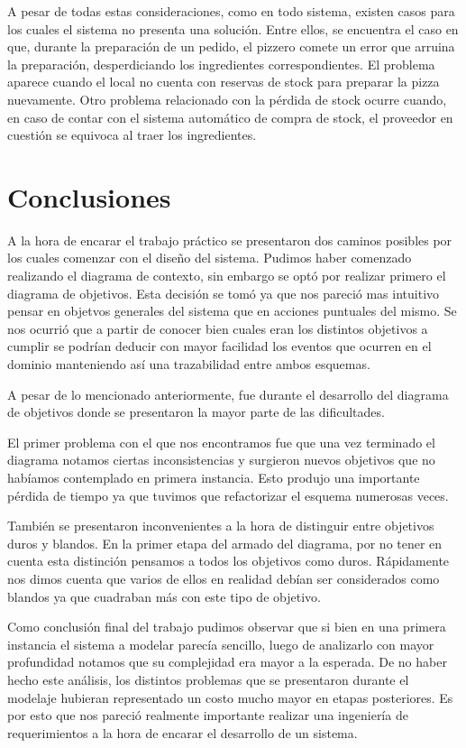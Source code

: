 \documentclass[a4paper,11pt] {article}
\begin{document}
A pesar de todas estas consideraciones, como en todo sistema, existen casos para los cuales el sistema no presenta una soluci\'on. Entre ellos, se encuentra el caso en que, durante la preparaci\'on de un pedido, el pizzero comete un error que arruina la preparaci\'on, desperdiciando los ingredientes correspondientes. El problema aparece cuando el local no cuenta con reservas de stock para preparar la pizza nuevamente. Otro problema relacionado con la p\'erdida de stock ocurre cuando, en caso de contar con el sistema autom\'atico de compra de stock, el proveedor en cuesti\'on se equivoca al traer los ingredientes.

\section*{Conclusiones}

A la hora de encarar el trabajo pr\'actico se presentaron dos caminos posibles por los cuales comenzar con el dise\~no del sistema. Pudimos haber comenzado realizando el diagrama de contexto, sin embargo se opt\'o por realizar primero el diagrama de objetivos. Esta decisi\'on se tom\'o ya que nos pareci\'o mas intuitivo pensar en objetvos generales del sistema que en acciones puntuales del mismo. Se nos ocurri\'o que a partir de conocer bien cuales eran los distintos objetivos a cumplir se podr\'ian deducir con mayor facilidad los eventos que ocurren en el dominio manteniendo as\'i una trazabilidad entre ambos esquemas.

A pesar de lo mencionado anteriormente, fue durante el desarrollo del diagrama de objetivos donde se presentaron la mayor parte de las dificultades. 

El primer problema con el que nos encontramos fue que una vez terminado el diagrama notamos ciertas inconsistencias y surgieron nuevos objetivos que no hab\'iamos contemplado en primera instancia. Esto produjo una importante p\'erdida de tiempo ya que tuvimos que refactorizar el esquema numerosas veces.

Tambi\'en se presentaron inconvenientes a la hora de distinguir entre objetivos duros y blandos. En la primer etapa del armado del diagrama, por no tener en cuenta esta distinci\'on pensamos a todos los objetivos como duros. R\'apidamente nos dimos cuenta que varios de ellos en realidad deb\'ian ser considerados como blandos ya que cuadraban m\'as con este tipo de objetivo.

Como conclusi\'on final del trabajo pudimos observar que si bien en una primera instancia el sistema a modelar parec\'ia sencillo, luego de analizarlo con mayor profundidad notamos que su complejidad era mayor a la esperada. De no haber hecho este an\'alisis, los distintos problemas que se presentaron durante el modelaje hubieran representado un costo mucho mayor en etapas posteriores. Es por esto que nos pareci\'o realmente importante realizar una ingenier\'ia de requerimientos a la hora de encarar el desarrollo de un sistema.
\end{document}
